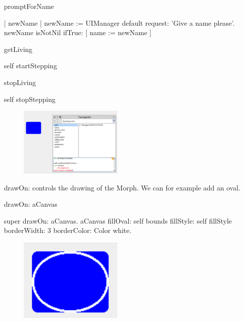 \documentclass[a4paper,10pt,twoside]{book}
\begin{document}
\begin{code}{}
promptForName

	| newName |
	newName := UIManager default request: 'Give a name please'.
	newName isNotNil 
		ifTrue: [ name := newName ]
\end{code}

\begin{code}{}
getLiving

	self startStepping
\end{code}

\begin{code}{}
stopLiving

	self stopStepping
\end{code}



\begin{figure}
\begin{center}
\includegraphics[width=5cm]{figures/LargerRounder}
\caption{\label{fig:tomastate}}
\end{center}
\end{figure}



drawOn: controls the drawing of the Morph. We can for example add an oval. 

\begin{code}{}
drawOn: aCanvas

	super drawOn: aCanvas.
	aCanvas fillOval: self bounds
			fillStyle: self fillStyle 
			borderWidth: 3
			borderColor: Color white.
	
\end{code}

\begin{figure}
\begin{center}
\includegraphics[width=5cm]{figures/WithEllipse}
\caption{\label{fig:tomastate}}
\end{center}
\end{figure}
\end{document}

